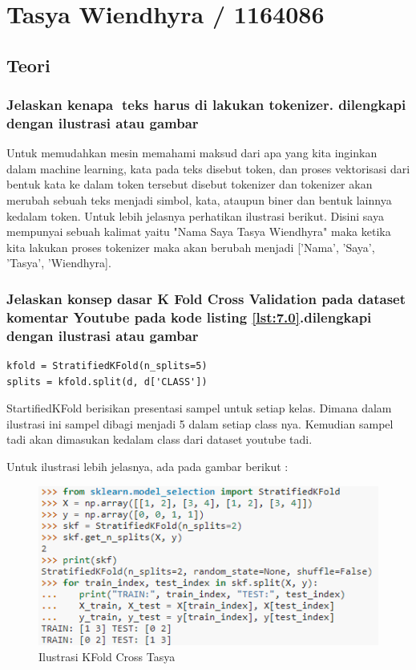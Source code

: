 \section{Tasya Wiendhyra / 1164086}
\subsection{Teori}
\subsubsection{Jelaskan kenapa teks harus di lakukan tokenizer. dilengkapi dengan ilustrasi atau gambar}
Untuk memudahkan mesin memahami maksud dari apa yang kita inginkan dalam machine learning, kata pada teks disebut token, dan proses vektorisasi dari bentuk kata ke dalam token tersebut disebut tokenizer dan tokenizer akan merubah sebuah teks menjadi simbol, kata, ataupun biner dan bentuk lainnya kedalam token. Untuk lebih jelasnya perhatikan ilustrasi berikut. Disini saya mempunyai sebuah kalimat yaitu "Nama Saya Tasya Wiendhyra" maka ketika kita lakukan proses tokenizer maka akan berubah menjadi ['Nama', 'Saya', 'Tasya', 'Wiendhyra].

\subsubsection{Jelaskan konsep dasar K Fold Cross Validation pada dataset komentar Youtube pada kode listing \ref{lst:7.0}.dilengkapi dengan ilustrasi atau gambar} 
\begin{lstlisting}[caption=K Fold Cross Validation,label={lst:7.0}]
kfold = StratifiedKFold(n_splits=5)
splits = kfold.split(d, d['CLASS'])
\end{lstlisting}

StartifiedKFold berisikan presentasi sampel untuk setiap kelas. Dimana dalam ilustrasi ini sampel dibagi menjadi 5 dalam setiap class nya. Kemudian sampel tadi akan dimasukan kedalam class dari dataset youtube tadi.

Untuk ilustrasi lebih jelasnya, ada pada gambar berikut :
\begin{figure}[ht]
\centering
\includegraphics[scale=0.5]{figures/Chapter 7/1164086/Teori/chapter7tasya1.png}
\caption{Ilustrasi KFold Cross Tasya}
\label{Teori}
\end{figure}

